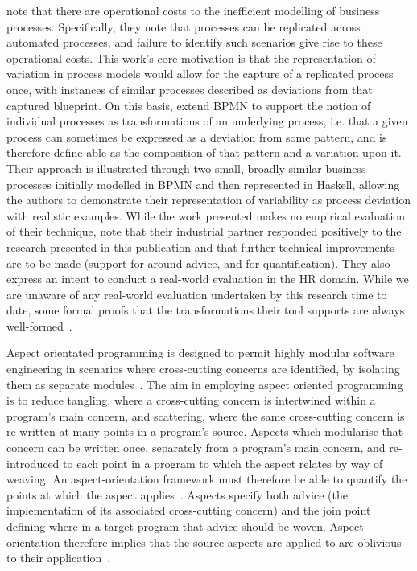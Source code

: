 

\citeauthor{Machado_2011} note that there are operational costs to the
inefficient modelling of business processes. Specifically, they note that
processes can be replicated across automated processes, and failure to identify
such scenarios give rise to these operational costs. This work's core motivation
is that the representation of variation in process models would allow for the
capture of a replicated process once, with instances of similar processes
described as deviations from that captured blueprint. On this basis,
\citeauthor{Machado_2011} extend BPMN to support the notion of individual
processes as transformations of an underlying process, i.e. that a given process
can sometimes be expressed as a deviation from some pattern, and is therefore
define-able as the composition of that pattern and a variation upon it. Their
approach is illustrated through two small, broadly similar business processes
initially modelled in BPMN and then represented in Haskell, allowing the authors
to demonstrate their representation of variability as process deviation with
realistic examples. While the work presented makes no empirical evaluation of
their technique, \citeauthor{Machado_2011} note that their industrial partner
responded positively to the research presented in this publication and that
further technical improvements are to be made (support for around advice, and
for quantification). They also express an intent to conduct a real-world
evaluation in the HR domain. While we are unaware of any real-world evaluation
undertaken by this research time to date, some formal proofs that the
transformations their tool supports are always well-formed~\cite{machado2012formal}.




Aspect orientated programming is designed to permit highly modular software
engineering in scenarios where cross-cutting concerns are identified, by
isolating them as separate modules~\cite{kiczales1997aspect}. The aim in
employing aspect oriented programming is to reduce tangling, where a
cross-cutting concern is intertwined within a program's main concern, and
scattering, where the same cross-cutting concern is re-written at many points in
a program's source. Aspects which modularise that concern can be written once,
separately from a program's main concern, and re-introduced to each point in a
program to which the aspect relates by way of weaving. An aspect-orientation
framework must therefore be able to quantify the points at which the aspect
applies~\cite{filman2000aspect}. Aspects specify both advice (the implementation
of its associated cross-cutting concern) and the join point defining where in a
target program that advice should be woven. Aspect orientation therefore implies
that the source aspects are applied to are oblivious to their
application~\cite{filman2000aspect}.

